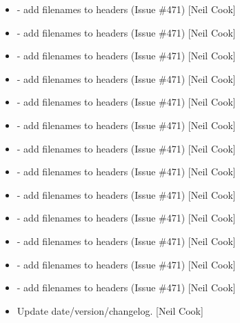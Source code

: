 \documentclass[a4paper,10pt,english]{report}
\begin{document}
\begin{itemize}
\item {} 
 - add filenames to headers (Issue  \#471) {[}Neil
Cook{]}

\item {} 
 - add filenames to headers (Issue  \#471)
{[}Neil Cook{]}

\item {} 
 - add filenames to headers (Issue  \#471) {[}Neil
Cook{]}

\item {} 
 - add filenames to headers (Issue  \#471) {[}Neil
Cook{]}

\item {} 
 - add filenames to headers (Issue  \#471) {[}Neil
Cook{]}

\item {} 
 - add filenames to headers (Issue  \#471)
{[}Neil Cook{]}

\item {} 
 - add filenames to headers (Issue  \#471) {[}Neil
Cook{]}

\item {} 
 - add filenames to headers (Issue  \#471)
{[}Neil Cook{]}

\item {} 
 - add filenames to headers (Issue  \#471) {[}Neil
Cook{]}

\item {} 
 - add filenames to headers (Issue  \#471)
{[}Neil Cook{]}

\item {} 
 - add filenames to headers (Issue  \#471) {[}Neil Cook{]}

\item {} 
 - add filenames to headers (Issue  \#471) {[}Neil
Cook{]}

\item {} 
 - add filenames to headers (Issue  \#471) {[}Neil
Cook{]}

\item {} 
Update date/version/changelog. {[}Neil Cook{]}


\end{itemize}
\end{document}
